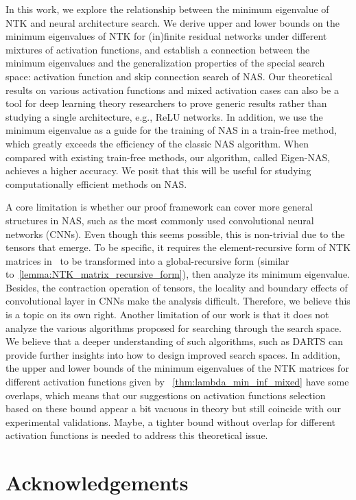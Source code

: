 \documentclass[nohyperref]{article}
\theoremstyle{plain}
\theoremstyle{definition}
\theoremstyle{remark}
\begin{document}
In this work, we explore the relationship between the minimum eigenvalue of NTK and neural architecture search. We derive upper and lower bounds on the minimum eigenvalues of NTK for (in)finite residual networks under different mixtures of activation functions, and establish a connection between the minimum eigenvalues and the generalization properties of the special search space: activation function and skip connection search of NAS. Our theoretical results on various activation functions and mixed activation cases can also be a tool for deep learning theory researchers to prove generic results rather than studying a single architecture, e.g., ReLU networks. In addition, we use the minimum eigenvalue as a guide for the training of NAS in a train-free method, which greatly exceeds the efficiency of the classic NAS algorithm. When compared with existing train-free methods, our algorithm, called Eigen-NAS, achieves a higher accuracy. We posit that this will be useful for studying computationally efficient methods on NAS.

A core limitation is whether our proof framework can cover more general structures in NAS, such as the most commonly used convolutional neural networks (CNNs). Even though this seems possible, this is non-trivial due to the tensors that emerge. To be specific, it requires the element-recursive form of NTK matrices in~\citet{arora2019exact} to be transformed into a global-recursive form (similar to~\cref{lemma:NTK_matrix_recursive_form}), then analyze its minimum eigenvalue. Besides, the contraction operation of tensors, the locality and boundary effects of convolutional layer in CNNs make the analysis difficult. Therefore, we believe this is a topic on its own right.
Another limitation of our work is that it does not analyze the various algorithms proposed for searching through the search space. We believe that a deeper understanding of such algorithms, such as DARTS can provide further insights into how to design improved search spaces. 
In addition, the upper and lower bounds of the minimum eigenvalues of the NTK matrices for different activation functions given by ~\cref{thm:lambda_min_inf_mixed} have some overlaps, which means that our suggestions on activation functions selection based on these bound appear a bit vacuous in theory but still coincide with our experimental validations.
Maybe, a tighter bound without overlap for different activation functions is needed to address this theoretical issue.
 \section*{Acknowledgements}
\label{sec:acks}
\end{document}

